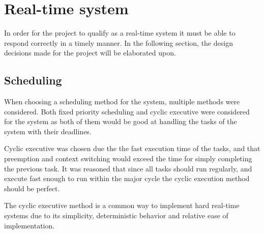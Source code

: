 \section{Real-time system}\label{Design:RTS} 
In order for the project to qualify as a real-time system it must be able to respond correctly in a timely manner. 
In the following section, the design decisions made for the project will be elaborated upon. 


\subsection{Scheduling}\label{Design:Scheduling}
When choosing a scheduling method for the system, multiple methods were considered. 
Both fixed priority scheduling and cyclic executive were considered for the system as both of them would be good at handling the tasks of the system with their deadlines.

Cyclic executive was chosen due the the fast execution time of the tasks, and that preemption and context switching would exceed the time for simply completing the previous task. 
It was reasoned that since all tasks should run regularly, and execute fast enough to run within the major cycle the cyclic execution method should be perfect. 

The cyclic executive method is a common way to implement hard real-time systems due to its simplicity, deterministic behavior and relative ease of implementation\cite{CyclicExecutionKimLarsen}.